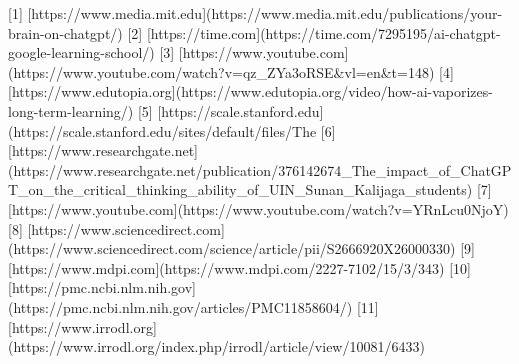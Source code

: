 [1] [https://www.media.mit.edu](https://www.media.mit.edu/publications/your-brain-on-chatgpt/)
[2] [https://time.com](https://time.com/7295195/ai-chatgpt-google-learning-school/)
[3] [https://www.youtube.com](https://www.youtube.com/watch?v=qz_ZYa3oRSE&vl=en&t=148)
[4] [https://www.edutopia.org](https://www.edutopia.org/video/how-ai-vaporizes-long-term-learning/)
[5] [https://scale.stanford.edu](https://scale.stanford.edu/sites/default/files/The%
[6] [https://www.researchgate.net](https://www.researchgate.net/publication/376142674_The_impact_of_ChatGPT_on_the_critical_thinking_ability_of_UIN_Sunan_Kalijaga_students)
[7] [https://www.youtube.com](https://www.youtube.com/watch?v=YRnLcu0NjoY)
[8] [https://www.sciencedirect.com](https://www.sciencedirect.com/science/article/pii/S2666920X26000330)
[9] [https://www.mdpi.com](https://www.mdpi.com/2227-7102/15/3/343)
[10] [https://pmc.ncbi.nlm.nih.gov](https://pmc.ncbi.nlm.nih.gov/articles/PMC11858604/)
[11] [https://www.irrodl.org](https://www.irrodl.org/index.php/irrodl/article/view/10081/6433)
